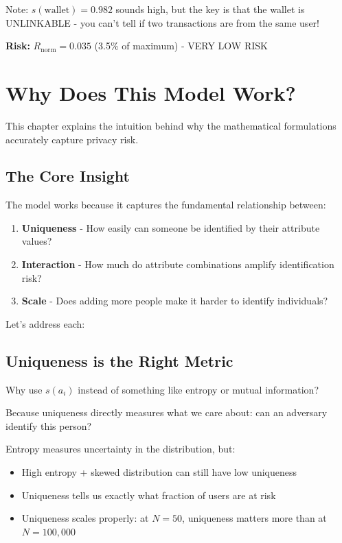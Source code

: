 \documentclass[12pt,a4paper,oneside,openany]{report}
\begin{document}
Note: $s(\text{wallet}) = 0.982$ sounds high, but the key is that the wallet is UNLINKABLE - you can't tell if two transactions are from the same user!

\textbf{Risk:} $R_{\mathrm{norm}} = 0.035$ (3.5\% of maximum) - VERY LOW RISK

\chapter{Why Does This Model Work?}
\label{chap:why}

This chapter explains the intuition behind why the mathematical formulations accurately capture privacy risk.

\section{The Core Insight}
\label{sec:insight}

The model works because it captures the fundamental relationship between:

\begin{enumerate}
    \item \textbf{Uniqueness} - How easily can someone be identified by their attribute values?
    \item \textbf{Interaction} - How much do attribute combinations amplify identification risk?
    \item \textbf{Scale} - Does adding more people make it harder to identify individuals?
\end{enumerate}

Let's address each:

\section{Uniqueness is the Right Metric}
\label{sec:why_unique}

Why use $s(a_i)$ instead of something like entropy or mutual information?

Because uniqueness directly measures what we care about: can an adversary identify this person?

Entropy measures uncertainty in the distribution, but:
\begin{itemize}
    \item High entropy + skewed distribution can still have low uniqueness
    \item Uniqueness tells us exactly what fraction of users are at risk
    \item Uniqueness scales properly: at $N = 50$, uniqueness matters more than at $N = 100,000$
\end{itemize}
\end{document}
